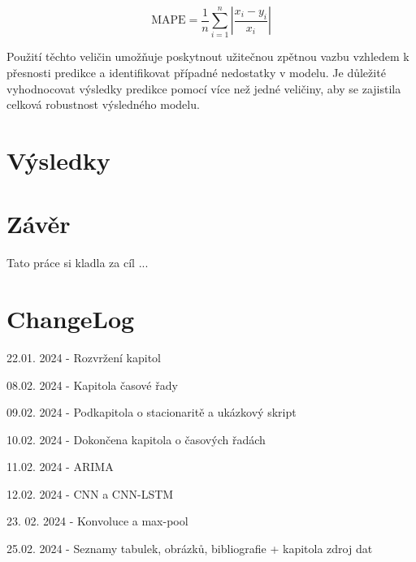 \documentclass[FM,BP,fonts]{tulthesis}
\begin{document}
\begin{equation}
	\text{MAPE} = \frac{1}{n}\sum_{i=1}^{n}|\frac{x_i-y_i}{x_i}| 
\end{equation}

Použití těchto veličin umožňuje poskytnout užitečnou zpětnou vazbu vzhledem k přesnosti predikce a identifikovat případné nedostatky v modelu. Je důležité vyhodnocovat výsledky predikce pomocí více než jedné veličiny, aby se zajistila celková robustnost výsledného modelu.


\chapter{Výsledky}\label{Výsledky}

\chapter{Závěr}
Tato práce si kladla za cíl ... 

\chapter{ChangeLog}

22.01. 2024 - Rozvržení kapitol

08.02. 2024 - Kapitola časové řady

09.02. 2024 - Podkapitola o stacionaritě a ukázkový skript

10.02. 2024 - Dokončena kapitola o časových řadách

11.02. 2024 - ARIMA 

12.02. 2024 - CNN a CNN-LSTM 

23. 02. 2024 - Konvoluce a max-pool

25.02. 2024 - Seznamy tabulek, obrázků, bibliografie + kapitola zdroj dat


\printbibliography[title={Použitá literatura}] %

\end{document}
